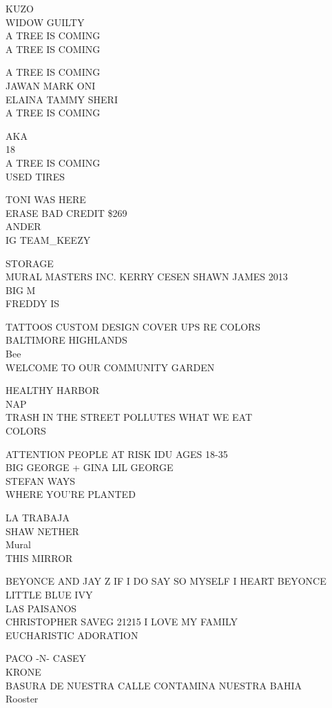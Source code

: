 \documentclass[10pt,letterpaper]{article}
\begin{document}
KUZO\\
WIDOW GUILTY\\
A TREE IS COMING\\
A TREE IS COMING

A TREE IS COMING\\
JAWAN MARK ONI\\
ELAINA TAMMY SHERI\\
A TREE IS COMING

AKA\\
18\\
A TREE IS COMING\\
USED TIRES

TONI WAS HERE\\
ERASE BAD CREDIT \$269\\
ANDER\\
IG TEAM\_KEEZY

STORAGE\\
MURAL MASTERS INC. KERRY CESEN SHAWN JAMES 2013\\
BIG M\\
FREDDY IS

TATTOOS CUSTOM DESIGN COVER UPS RE COLORS\\
BALTIMORE HIGHLANDS\\
Bee\\
WELCOME TO OUR COMMUNITY GARDEN

HEALTHY HARBOR\\
NAP\\
TRASH IN THE STREET POLLUTES WHAT WE EAT\\
COLORS

ATTENTION PEOPLE AT RISK IDU AGES 18{-}35\\
BIG GEORGE + GINA LIL GEORGE\\
STEFAN WAYS\\
WHERE YOU'RE PLANTED

LA TRABAJA\\
SHAW NETHER\\
Mural\\
THIS MIRROR

BEYONCE AND JAY Z IF I DO SAY SO MYSELF I HEART BEYONCE LITTLE BLUE IVY\\
LAS PAISANOS\\
CHRISTOPHER SAVEG 21215 I LOVE MY FAMILY\\
EUCHARISTIC ADORATION

PACO {-}N{-} CASEY\\
KRONE\\
BASURA DE NUESTRA CALLE CONTAMINA NUESTRA BAHIA\\
Rooster
\end{document}
